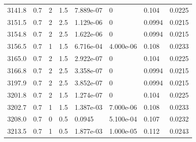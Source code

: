 \documentclass[preview]{standalone}
\begin{document}
{{{{{{{{{{{\begin{tabular}{L{1.2cm}C{1.2cm} C{0.3cm}C{0.5cm} C{1.4cm}C{1.4cm} C{1.4cm}C{1.4cm}}
  3141.8  &   0.7  & 2     & 1.5 &  7.889e-07  & 0  & 0.104 &  0.0225   \\ 
  3151.5  &   0.7  & 2     & 2.5 &  1.129e-06  & 0  & 0.0994 &  0.0215   \\ 
  3154.8  &   0.7  & 2     & 2.5 &  1.622e-06  & 0  & 0.0994 &  0.0215   \\ 
  3156.5  &   0.7  & 1     & 1.5 &  6.716e-04  & 4.000e-06  & 0.108 &  0.0233   \\ 
  3165.0  &   0.7  & 2     & 1.5 &  2.922e-07  & 0  & 0.104 &  0.0225   \\ 
  3166.8  &   0.7  & 2     & 2.5 &  3.358e-07  & 0  & 0.0994 &  0.0215   \\ 
  3197.9  &   0.7  & 2     & 2.5 &  3.852e-07  & 0  & 0.0994 &  0.0215   \\ 
  3201.8  &   0.7  & 2     & 1.5 &  1.274e-07  & 0  & 0.104 &  0.0225   \\ 
  3202.7  &   0.7  & 1     & 1.5 &  1.387e-03  & 7.000e-06  & 0.108 &  0.0233   \\ 
  3208.0  &   0.7  & 0     & 0.5 &  0.0945  & 5.100e-04  & 0.107 &  0.0232   \\ 
  3213.5  &   0.7  & 1     & 0.5 &  1.877e-03  & 1.000e-05  & 0.112 &  0.0243   \\ 
\hline 
\end{tabular} 

}}}}}}}}}}}
\end{document}
